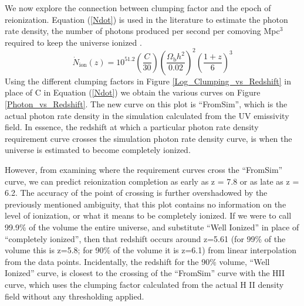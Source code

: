 \documentclass[letterpaper,10pt]{article}
\renewcommand{\(}{\left(}
\renewcommand{\)}{\right)}
\begin{document}
We now explore the connection between clumping factor and the epoch of
reionization.  Equation (\ref{Ndot}) is used in the literature to
estimate the photon rate density, the number of photons produced per second per
comoving Mpc$^3$ required to keep the universe ionized
\citep{MadauHaardtRees1999,FanCarilliKeating2006}. 
\begin{equation}
\label{Ndot}
\dot{N}_\mathrm{ion}(z)=10^{51.2}\left(\frac{C}{30}\right)\left(\frac{\Omega_\mathrm{b} h^2}{0.02}\right)^{2}\left(\frac{1+z}{6}\right)^{3}
\end{equation}
Using the different clumping factors in Figure
\ref{Log_Clumping_vs_Redshift} in place of C in Equation (\ref{Ndot}) we
obtain the various curves on Figure \ref{Photon_vs_Redshift}.  The new
curve on this plot is ``FromSim'', which is the actual photon rate
density in the simulation calculated from the UV emissivity field.  In
essence, the redshift at which a particular photon rate density
requirement curve crosses the simulation photon rate density curve, is
when the universe is estimated to become completely ionized.    

However, from examining where the requirement curves cross the
``FromSim'' curve, we can predict reionization completion as early as
z = 7.8 or as late as z = 6.2.  The accuracy of the point of crossing
is further overshadowed by the previously mentioned ambiguity, that
this plot contains no information on the level of ionization, or what
it means to be completely ionized.  If we were to call 99.9\% of the
volume the entire universe, and substitute ``Well Ionized'' in place
of ``completely ionized'', then that redshift occurs around z=5.61
(for 99\% of the volume this is z=5.8; for 90\% of the volume it is
z=6.1) from linear interpolation from the data points.  Incidentally,
the redshift for the 90\% volume, ``Well Ionized'' curve, is closest
to the crossing of the ``FromSim'' curve with the H{\footnotesize II}
curve, which uses the clumping factor calculated from the actual H
{\footnotesize II} density field without any thresholding applied.
\end{document}
